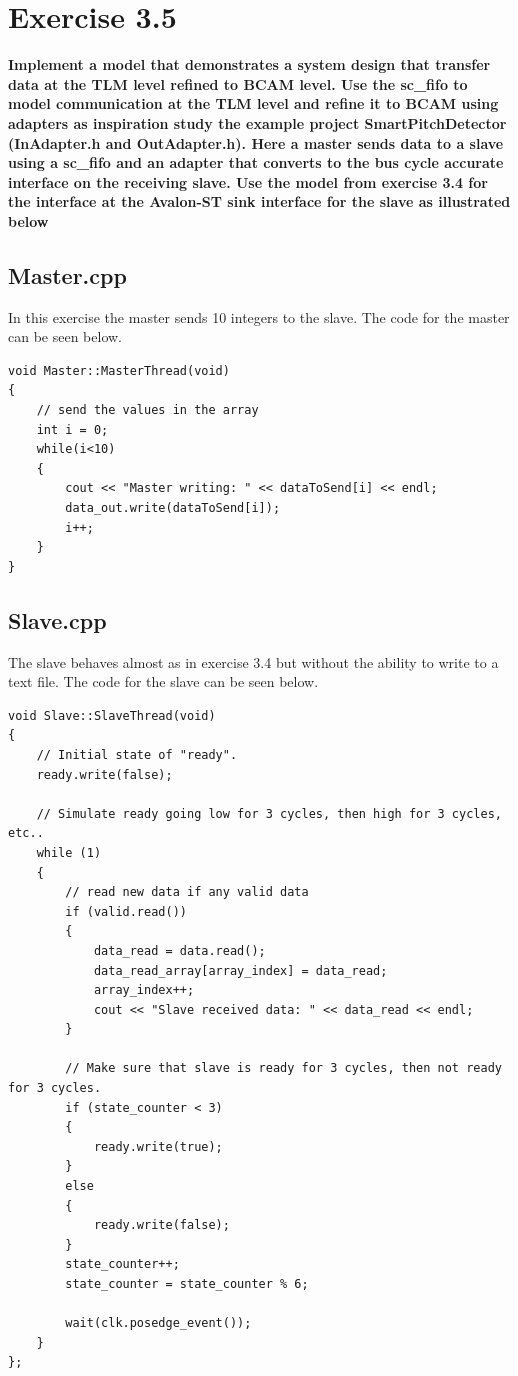 
\chapter{Exercise 3.5}
\textbf{Implement a model that demonstrates a system design that transfer data at the TLM level
refined to BCAM level. Use the sc\_fifo to model communication at the TLM level and refine it to
BCAM using adapters as inspiration study the example project SmartPitchDetector (InAdapter.h
and OutAdapter.h). Here a master sends data to a slave using a sc\_fifo and an adapter that
converts to the bus cycle accurate interface on the receiving slave. Use the model from exercise
3.4 for the interface at the Avalon-ST sink interface for the slave as illustrated below}

\section{Master.cpp}
In this exercise the master sends 10 integers to the slave. The code for the master can be seen below.
\begin{lstlisting}
void Master::MasterThread(void)
{
	// send the values in the array
	int i = 0;
	while(i<10)
	{
		cout << "Master writing: " << dataToSend[i] << endl;
		data_out.write(dataToSend[i]);
		i++;
	}
}
\end{lstlisting}


\section{Slave.cpp}
The slave behaves almost as in exercise 3.4 but without the ability to write to a text file. The code for the slave can be seen below.

\begin{lstlisting}
void Slave::SlaveThread(void)
{
	// Initial state of "ready".
	ready.write(false);
	
	// Simulate ready going low for 3 cycles, then high for 3 cycles, etc..
	while (1)
	{
		// read new data if any valid data
		if (valid.read())
		{
			data_read = data.read();
			data_read_array[array_index] = data_read;
			array_index++;
			cout << "Slave received data: " << data_read << endl;
		}
		
		// Make sure that slave is ready for 3 cycles, then not ready for 3 cycles.
		if (state_counter < 3)
		{
			ready.write(true);
		}
		else
		{
			ready.write(false);
		}
		state_counter++;
		state_counter = state_counter % 6;
		
		wait(clk.posedge_event());
	}
};
\end{lstlisting}


